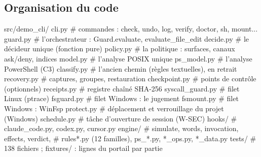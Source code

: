 \subsection{Organisation du code}
\begin{terminal}
src/demo_cli/
  cli.py              # commandes : check, undo, log, verify, doctor, sh, mount...
  guard.py            # l'orchestrateur : Guard.evaluate, evaluate_file_edit
  decide.py           # le décideur unique (fonction pure)
  policy.py           # la politique : surfaces, canaux ask/deny, indices
  model.py            # l'analyse POSIX unique
  ps_model.py         # l'analyse PowerShell (C3)
  classify.py         # l'ancien chemin (règles textuelles), en retrait
  recovery.py         # captures, groupes, restauration
  checkpoint.py       # points de contrôle (optionnels)
  receipts.py         # registre chaîné SHA-256
  syscall_guard.py    # filet Linux (ptrace)
  fsguard.py          # filet Windows : le jugement
  fsmount.py          # filet Windows : WinFsp
  protect.py          # déplacement et verrouillage du projet (Windows)
  schedule.py         # tâche d'ouverture de session (W-SEC)
  hooks/              # claude_code.py, codex.py, cursor.py
  engine/             # simulate, words, invocation, effects, verdict,
                      # rules*.py (12 familles), ps_*.py, *_ops.py, *_data.py
tests/                # 138 fichiers ; fixtures/ : lignes du portail par partie
\end{terminal}
